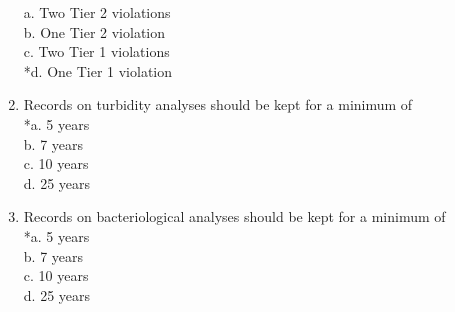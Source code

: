 \begin{enumerate}[1.]
a. Two Tier 2 violations\\
b. One Tier 2 violation\\
c. Two Tier 1 violations\\
*d. One Tier 1 violation\\
\item Records on turbidity analyses should be kept for a minimum of\\
*a. 5 years\\
b. 7 years\\
c. 10 years\\
d. 25 years\\
\item Records on bacteriological analyses should be kept for a minimum of\\
*a. 5 years\\
b. 7 years\\
c. 10 years\\
d. 25 years\\

\end{enumerate}


\newpage
